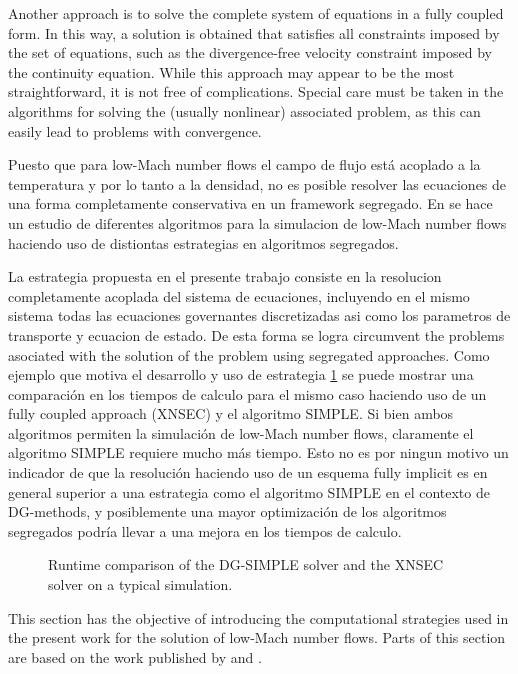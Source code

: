 Another approach is to solve the complete system of equations in a fully coupled form. In this way, a solution is obtained that satisfies all constraints imposed by the set of equations, such as the divergence-free velocity constraint imposed by the continuity equation. While this approach may appear to be the most straightforward, it is not free of complications. Special care must be taken in the algorithms for solving the (usually nonlinear) associated problem, as this can easily lead to problems with convergence. 



Puesto que para low-Mach number flows el campo de flujo está acoplado a la temperatura y por lo tanto a la densidad, no es posible resolver las ecuaciones de una forma completamente conservativa en un framework segregado.  En \textcite{knikkerComparativeStudyHighorder2011} se hace un estudio de diferentes algoritmos para la simulacion de low-Mach number flows haciendo uso de distiontas estrategias en algoritmos segregados. 


La estrategia propuesta en el presente trabajo consiste en la resolucion completamente acoplada del sistema de ecuaciones, incluyendo en el mismo sistema todas las ecuaciones governantes discretizadas asi como los parametros de transporte y ecuacion de estado. De esta forma se logra circumvent the problems asociated with the solution of the problem using segregated approaches. Como ejemplo que motiva el desarrollo y uso de estrategia \cref{fig:RuntimeComparisonk2} se puede mostrar una comparación en los tiempos de calculo para el mismo caso haciendo uso de un fully coupled approach (XNSEC) y el algoritmo SIMPLE. Si bien ambos algoritmos permiten la simulación de low-Mach number flows, claramente el algoritmo SIMPLE requiere mucho más tiempo. Esto no es por ningun motivo un indicador de que la resolución haciendo uso de un esquema fully implicit es en general superior a una estrategia como el algoritmo SIMPLE en el contexto de DG-methods, y posiblemente una mayor optimización de los algoritmos segregados podría llevar a una mejora en los tiempos de calculo.

\begin{figure}[h]	
	\centering
	\caption{Runtime comparison of the DG-SIMPLE solver and the XNSEC solver on a typical simulation.}
	\label{fig:RuntimeComparisonk2}
\end{figure}

This section has the objective of introducing the computational strategies used in the present work for the solution of low-Mach number flows. Parts of this section are based on the work published by \textcite{kikkerFullyCoupledHighorder} and \textcite{gutierrez-jorqueraFullyCoupledHigh2022}.

